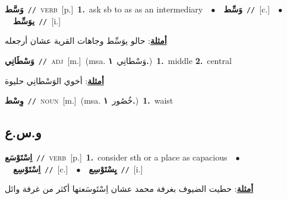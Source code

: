 \documentclass[10pt,a4paper,twoside]{article} %
\begin{document}
\begin{multicols}{2}
{\setlength\topsep{0pt}\textbf{\foreignlanguage{arabic}{وَسَّط}}\ {\color{gray}\texttt{//}\color{black}}\ \textsc{verb}\ [p.]\ \textbf{1.}~ask sb to as as an intermediary\ \ $\bullet$\ \ \setlength\topsep{0pt}\textbf{\foreignlanguage{arabic}{وَسِّط}}\ {\color{gray}\texttt{//}\color{black}}\ [c.]\ \ $\bullet$\ \ \setlength\topsep{0pt}\textbf{\foreignlanguage{arabic}{يوَسِّط}}\ {\color{gray}\texttt{//}\color{black}}\ [i.]\  \begin{flushright}\color{gray}\foreignlanguage{arabic}{\textbf{\underline{\foreignlanguage{arabic}{أمثلة}}}: حالو يوَسِّط وجاهات القرية عشان أرجعله}\end{flushright}\color{black}} \vspace{2mm}

{\setlength\topsep{0pt}\textbf{\foreignlanguage{arabic}{وَسْطَانِي}}\ {\color{gray}\texttt{//}\color{black}}\ \textsc{adj}\ [m.]\ \color{gray}(msa. \foreignlanguage{arabic}{وَسْطانِي}~\foreignlanguage{arabic}{\textbf{١.}})\color{black}\ \textbf{1.}~middle  \textbf{2.}~central\  \begin{flushright}\color{gray}\foreignlanguage{arabic}{\textbf{\underline{\foreignlanguage{arabic}{أمثلة}}}: أخوي الوَسْطانِي حليوة}\end{flushright}\color{black}} \vspace{2mm}

{\setlength\topsep{0pt}\textbf{\foreignlanguage{arabic}{وِسْط}}\ {\color{gray}\texttt{//}\color{black}}\ \textsc{noun}\ [m.]\ \color{gray}(msa. \foreignlanguage{arabic}{خُصُور}~\foreignlanguage{arabic}{\textbf{١.}})\color{black}\ \textbf{1.}~waist\ } \vspace{2mm}

\vspace{-3mm}
\subsection*{\color{blue}\foreignlanguage{arabic}{و.س.ع}\color{blue}{}} 

{\setlength\topsep{0pt}\textbf{\foreignlanguage{arabic}{اِسْتَوْسَع}}\ {\color{gray}\texttt{//}\color{black}}\ \textsc{verb}\ [p.]\ \textbf{1.}~consider sth or a place as capacious\ \ $\bullet$\ \ \setlength\topsep{0pt}\textbf{\foreignlanguage{arabic}{اِسْتَوْسِع}}\ {\color{gray}\texttt{//}\color{black}}\ [c.]\ \ $\bullet$\ \ \setlength\topsep{0pt}\textbf{\foreignlanguage{arabic}{يِسْتَوْسِع}}\ {\color{gray}\texttt{//}\color{black}}\ [i.]\  \begin{flushright}\color{gray}\foreignlanguage{arabic}{\textbf{\underline{\foreignlanguage{arabic}{أمثلة}}}: حطيت الضيوف بغرفة محمد عشان اِسْتَوسَعتها أكثر من غرفة وائل}\end{flushright}\color{black}} \vspace{2mm}


\end{multicols}
\end{document}
